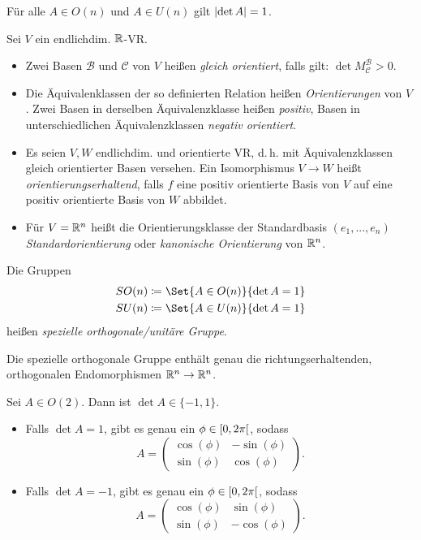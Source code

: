 \documentclass{cheat-sheet}
\newcommand{\BB}{\mathcal{B}}
\newcommand{\BC}{\mathcal{C}}
\begin{document}
\begin{bem}
  Für alle $A \in O(n)$ und $A \in U(n)$ gilt $\lvert\det A\rvert = 1$.
\end{bem}

\begin{defn}
  Sei $V$ ein endlichdim. $\mathbb{R}$-VR.
  \begin{itemize}
    \item Zwei Basen $\BB$ und $\BC$ von $V$ heißen \emph{gleich orientiert}, falls gilt: $\det M_{\BC}^{\BB} > 0$.
    \item Die Äquivalenklassen der so definierten Relation heißen \emph{Orientierungen} von $V$. Zwei Basen in derselben Äquivalenzklasse heißen \emph{positiv}, Basen in unterschiedlichen Äquivalenzklassen \emph{negativ orientiert}.
    \item Es seien $V, W$ endlichdim. und orientierte VR, d.\,h. mit Äquivalenzklassen gleich orientierter Basen versehen. Ein Isomorphismus $V \to W$ heißt \emph{orientierungserhaltend}, falls $f$ eine positiv orientierte Basis von $V$ auf eine positiv orientierte Basis von $W$ abbildet.
    \item Für $V = \mathbb{R}^n$ heißt die Orientierungsklasse der Standardbasis $(e_1, ..., e_n)$ \emph{Standardorientierung} oder \emph{kanonische Orientierung} von $\mathbb{R}^n$.
  \end{itemize}
\end{defn}

\begin{defn}
  Die Gruppen
  \begin{align*}
  SO(n) \coloneqq \Set{ A \in O(n) }{ \det A = 1 } \\
  SU(n) \coloneqq \Set{ A \in U(n) }{ \det A = 1 }
  \end{align*}
  heißen \emph{spezielle orthogonale/unitäre Gruppe}.
\end{defn}

\begin{bem}
  Die spezielle orthogonale Gruppe enthält genau die richtungserhaltenden, orthogonalen Endomorphismen $\mathbb{R}^n \to \mathbb{R}^n$.
\end{bem}

\begin{satz}
  Sei $A \in O(2)$. Dann ist $\det A \in \{ -1, 1 \}$.
  \begin{itemize}
    \item Falls $\det A = 1$, gibt es genau ein $\phi \in \left[ 0, 2 \pi \right[$, sodass
    \[ A = \begin{pmatrix} \cos(\phi) & - \sin(\phi) \\ \sin(\phi) & \cos(\phi) \end{pmatrix}. \]
    \item Falls $\det A = -1$, gibt es genau ein $\phi \in \left[ 0, 2 \pi \right[$, sodass
    \[ A = \begin{pmatrix} \cos(\phi) & \sin(\phi) \\ \sin(\phi) & - \cos(\phi) \end{pmatrix}. \]
  \end{itemize}
\end{satz}
\end{document}
